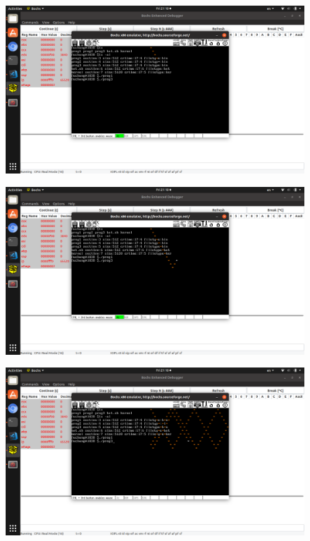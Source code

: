 \documentclass[a4paper,11pt,UTF8]{ctexart}
\newcommand{\bottomcaption}{%
\setlength{\abovecaptionskip}{6pt}%
\setlength{\belowcaptionskip}{6pt}%
\caption}
\newcommand{\xiaowuhao}{\fontsize{9pt}{\baselineskip}\selectfont}   %
\begin{document}
  \begin{figure}[!htbp]
    \centering
    \includegraphics[width=\textwidth]{imgs/Screenshot_from_2019-03-29_21-10-48.png}
    \bottomcaption{\xiaowuhao{Shot3}}
  \end{figure}
  \begin{figure}[!htbp]
    \centering
    \includegraphics[width=\textwidth]{imgs/Screenshot_from_2019-03-29_21-10-48_-_1.png}
    \bottomcaption{\xiaowuhao{Shot3}}
  \end{figure}
  \begin{figure}[!htbp]
    \centering
    \includegraphics[width=\textwidth]{imgs/Screenshot_from_2019-03-29_21-10-56.png}
    \bottomcaption{\xiaowuhao{Shot3}}
  \end{figure}
\end{document}
